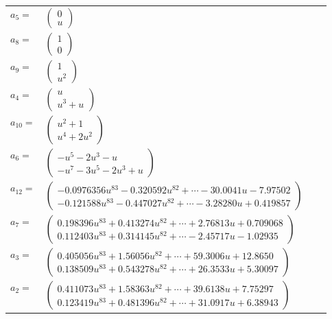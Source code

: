 \documentclass[1p]{elsarticle_modified}
\theoremstyle{definition}
\begin{document}
\begin{tabular}{m{7pt} m{180pt} m{7pt} m{180pt} }
\flushright $a_{5}=$&$\begin{pmatrix}0\\u\end{pmatrix}$ \\
\flushright $a_{8}=$&$\begin{pmatrix}1\\0\end{pmatrix}$ \\
\flushright $a_{9}=$&$\begin{pmatrix}1\\u^2\end{pmatrix}$ \\
\flushright $a_{4}=$&$\begin{pmatrix}u\\u^3+u\end{pmatrix}$ \\
\flushright $a_{10}=$&$\begin{pmatrix}u^2+1\\u^4+2 u^2\end{pmatrix}$ \\
\flushright $a_{6}=$&$\begin{pmatrix}- u^5-2 u^3- u\\- u^7-3 u^5-2 u^3+u\end{pmatrix}$ \\
\flushright $a_{12}=$&$\begin{pmatrix}-0.0976356 u^{83}-0.320592 u^{82}+\cdots-30.0041 u-7.97502\\-0.121588 u^{83}-0.447027 u^{82}+\cdots-3.28280 u+0.419857\end{pmatrix}$ \\
\flushright $a_{7}=$&$\begin{pmatrix}0.198396 u^{83}+0.413274 u^{82}+\cdots+2.76813 u+0.709068\\0.112403 u^{83}+0.314145 u^{82}+\cdots-2.45717 u-1.02935\end{pmatrix}$ \\
\flushright $a_{3}=$&$\begin{pmatrix}0.405056 u^{83}+1.56056 u^{82}+\cdots+59.3006 u+12.8650\\0.138509 u^{83}+0.543278 u^{82}+\cdots+26.3533 u+5.30097\end{pmatrix}$ \\
\flushright $a_{2}=$&$\begin{pmatrix}0.411073 u^{83}+1.58363 u^{82}+\cdots+39.6138 u+7.75297\\0.123419 u^{83}+0.481396 u^{82}+\cdots+31.0917 u+6.38943\end{pmatrix}$ \\

\end{tabular}
\end{document}
